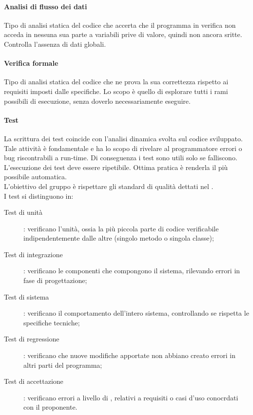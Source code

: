 \paragraph{Analisi di flusso dei dati} 
Tipo di analisi statica del codice che accerta che il programma in verifica non acceda in nessuna sua parte a variabili prive di valore, quindi non ancora sritte. Controlla l'assenza di dati globali.

\paragraph{Verifica formale} 
Tipo di analisi statica del codice che ne prova la sua correttezza rispetto ai requisiti imposti dalle specifiche. Lo scopo è quello di esplorare tutti i rami possibili di esecuzione, senza doverlo necessariamente eseguire. 

\paragraph{Test} 
La scrittura dei test coincide con l'analisi dinamica svolta sul codice sviluppato. Tale attività è fondamentale e ha lo scopo di rivelare al programmatore errori o bug riscontrabili a run-time. Di conseguenza i test sono utili solo se falliscono. \\
L'esecuzione dei test deve essere ripetibile. Ottima pratica è renderla il più possibile automatica. \\
L'obiettivo del gruppo è rispettare gli standard di qualità dettati nel \PdQv. \\
I test si distinguono in:
\begin{description}
	\item[Test di unità] : verificano l'unità, ossia la più piccola parte di codice verificabile indipendentemente dalle altre (singolo metodo o singola classe);
	\item[Test di integrazione] : verificano le componenti che compongono il sistema, rilevando errori in fase di progettazione;
	\item[Test di sistema] : verificano il comportamento dell'intero sistema, controllando se rispetta le specifiche tecniche;
	\item[Test di regressione] : verificano che nuove modifiche apportate non abbiano creato errori in altri parti del programma;
	\item[Test di accettazione] : verificano errori a livello di , relativi a requisiti o casi d'uso conocrdati con il proponente.
\end{description}

